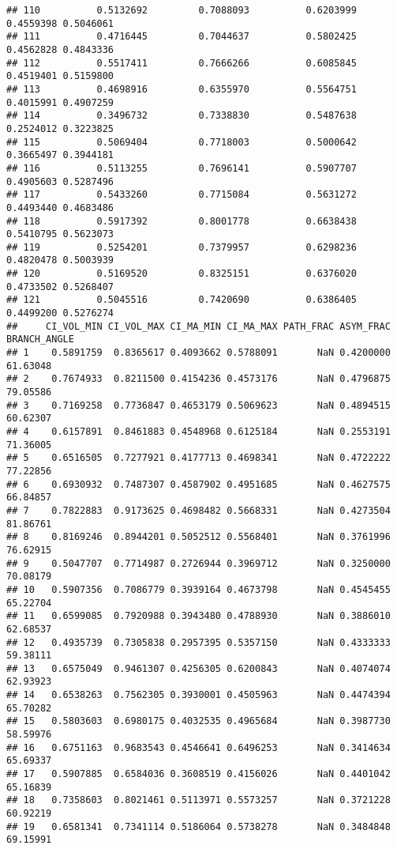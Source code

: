 \documentclass[]{article}
\begin{document}
\begin{verbatim}
## 110          0.5132692         0.7088093          0.6203999 0.4559398 0.5046061
## 111          0.4716445         0.7044637          0.5802425 0.4562828 0.4843336
## 112          0.5517411         0.7666266          0.6085845 0.4519401 0.5159800
## 113          0.4698916         0.6355970          0.5564751 0.4015991 0.4907259
## 114          0.3496732         0.7338830          0.5487638 0.2524012 0.3223825
## 115          0.5069404         0.7718003          0.5000642 0.3665497 0.3944181
## 116          0.5113255         0.7696141          0.5907707 0.4905603 0.5287496
## 117          0.5433260         0.7715084          0.5631272 0.4493440 0.4683486
## 118          0.5917392         0.8001778          0.6638438 0.5410795 0.5623073
## 119          0.5254201         0.7379957          0.6298236 0.4820478 0.5003939
## 120          0.5169520         0.8325151          0.6376020 0.4733502 0.5268407
## 121          0.5045516         0.7420690          0.6386405 0.4499200 0.5276274
##     CI_VOL_MIN CI_VOL_MAX CI_MA_MIN CI_MA_MAX PATH_FRAC ASYM_FRAC BRANCH_ANGLE
## 1    0.5891759  0.8365617 0.4093662 0.5788091       NaN 0.4200000     61.63048
## 2    0.7674933  0.8211500 0.4154236 0.4573176       NaN 0.4796875     79.05586
## 3    0.7169258  0.7736847 0.4653179 0.5069623       NaN 0.4894515     60.62307
## 4    0.6157891  0.8461883 0.4548968 0.6125184       NaN 0.2553191     71.36005
## 5    0.6516505  0.7277921 0.4177713 0.4698341       NaN 0.4722222     77.22856
## 6    0.6930932  0.7487307 0.4587902 0.4951685       NaN 0.4627575     66.84857
## 7    0.7822883  0.9173625 0.4698482 0.5668331       NaN 0.4273504     81.86761
## 8    0.8169246  0.8944201 0.5052512 0.5568401       NaN 0.3761996     76.62915
## 9    0.5047707  0.7714987 0.2726944 0.3969712       NaN 0.3250000     70.08179
## 10   0.5907356  0.7086779 0.3939164 0.4673798       NaN 0.4545455     65.22704
## 11   0.6599085  0.7920988 0.3943480 0.4788930       NaN 0.3886010     62.68537
## 12   0.4935739  0.7305838 0.2957395 0.5357150       NaN 0.4333333     59.38111
## 13   0.6575049  0.9461307 0.4256305 0.6200843       NaN 0.4074074     62.93923
## 14   0.6538263  0.7562305 0.3930001 0.4505963       NaN 0.4474394     65.70282
## 15   0.5803603  0.6980175 0.4032535 0.4965684       NaN 0.3987730     58.59976
## 16   0.6751163  0.9683543 0.4546641 0.6496253       NaN 0.3414634     65.69337
## 17   0.5907885  0.6584036 0.3608519 0.4156026       NaN 0.4401042     65.16839
## 18   0.7358603  0.8021461 0.5113971 0.5573257       NaN 0.3721228     60.92219
## 19   0.6581341  0.7341114 0.5186064 0.5738278       NaN 0.3484848     69.15991

\end{verbatim}
\end{document}
